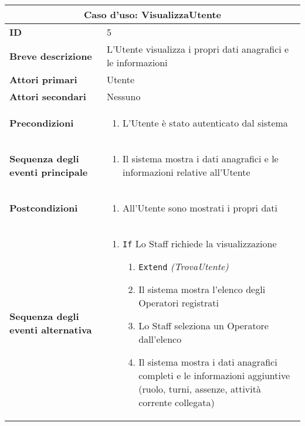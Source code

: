 \documentclass[a4paper]{report}
\begin{document}
\clearpage
\begin{table}[H]
\vspace*{-0cm}
\renewcommand{\arraystretch}{1.9}
\begin{tabular}{|p{3.9cm}|p{9.9cm}|}
\hline
\multicolumn{2}{|c|}{\textbf{Caso d’uso: VisualizzaUtente}} \\ \hline
\textbf{ID} & 5 \\ \hline
\textbf{Breve descrizione} & L’Utente visualizza i propri dati anagrafici e le informazioni \\ \hline
\textbf{Attori primari} & Utente \\ \hline
\textbf{Attori secondari} & Nessuno \\ \hline
\textbf{Precondizioni} & \begin{enumerate}[leftmargin=14pt,label=\arabic*.,labelsep=0.5em,topsep=0pt,partopsep=0pt,parsep=0pt,itemsep=0pt]
    \item L’Utente è stato autenticato dal sistema
\end{enumerate} \\ \hline
\textbf{Sequenza degli eventi principale} &
\begin{enumerate}[leftmargin=14pt,label=\arabic*.,labelsep=0.5em,topsep=0pt,partopsep=0pt,parsep=0pt,itemsep=0pt]
    \item Il sistema mostra i dati anagrafici  e le informazioni relative all’Utente
\end{enumerate}\\ \hline
\textbf{Postcondizioni} & \begin{enumerate}[leftmargin=14pt,label=\arabic*.,labelsep=0.5em,topsep=0pt,partopsep=0pt,parsep=0pt,itemsep=0pt]
    \item All’Utente sono mostrati i propri dati
    \end{enumerate} \\ \hline
\textbf{Sequenza degli eventi alternativa} & \begin{enumerate}[leftmargin=14pt,label=\arabic*.,labelsep=0.5em,topsep=0pt,partopsep=0pt,parsep=0pt,itemsep=0pt] 
    \item \texttt{If} Lo Staff richiede la visualizzazione
    \begin{enumerate}[label=\arabic{enumi}.\arabic*.,leftmargin=22pt,labelsep=0.5em,topsep=0pt,partopsep=0pt,parsep=0pt,itemsep=0pt]
        \item \texttt{Extend} \textit{(TrovaUtente)} 
        \item Il sistema mostra l’elenco degli Operatori registrati
        \item Lo Staff seleziona un Operatore dall’elenco
        \item Il sistema mostra i dati anagrafici completi e le informazioni aggiuntive (ruolo, turni, assenze, attività corrente collegata)
    \end{enumerate}
\end{enumerate}\\ \hline
\end{tabular}
\end{table}
\end{document}
